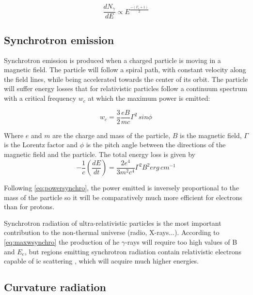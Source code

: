 \documentclass[main.tex]{subfiles}
\begin{document}
\begin{equation}
    \frac{dN_{\gamma}}{dE} \propto E^{\frac{-(\Gamma_e + 1)}{2}}
\end{equation}

\subsection{Synchrotron emission}

Synchrotron emission is produced when a charged particle is moving in a magnetic field. The particle will follow a spiral path, with constant velocity along the field lines, while being accelerated towards the center of its orbit. The particle will suffer energy losses that for relativistic particles follow a continuum spectrum \cite{weekes2003HEAstrophy} with a critical frequency $w_c$ at which the maximum power is emitted:

\begin{equation}\label{eq:maxwsynchro}
    w_c = \frac{3}{2}\frac{eB}{mc}\Gamma^2\,sin\phi
\end{equation}

Where $e$ and $m$ are the charge and mass of the particle, $B$ is the magnetic field, $\Gamma$ is the Lorentz factor and $\phi$ is the pitch angle between the directions of the magnetic field and the particle.
The total energy loss is given by
\begin{equation} \label{eq:powersynchro}
    -\frac{1}{c}\left( \frac{dE}{dt} \right) = \frac{2e^4}{3m^2c^4}\Gamma^2 B^2  erg \, cm^{-1}
\end{equation}

Following \ref{eq:powersynchro}, the power emitted is inversely proportional to the mass of the particle so it will be comparatively much more efficient for electrons than for protons. 

Synchrotron radiation of ultra-relativistic particles is the most important contribution to the non-thermal universe (radio, X-rays...). According to \ref{eq:maxwsynchro} the production of \gls{he} $\gamma$-rays will require too high values of B and $E_e$, but regions emitting synchrotron radiation contain relativistic electrons capable of \gls{ic} scattering \cite{HarwitAstroconcepts},  which will acquire much higher energies. 

\subsection{Curvature radiation}
\end{document}
